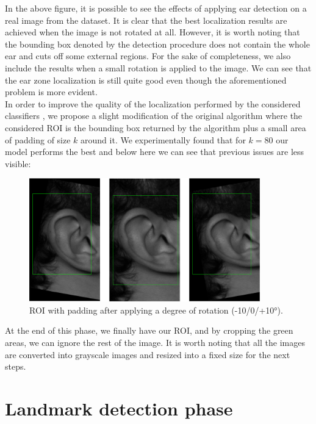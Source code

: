 \documentclass{article}
\begin{document}
In the above figure, it is possible to see the effects of applying ear detection on a real image from the
dataset. It is clear that the best localization results are achieved when the image is not rotated at all.
However, it is worth noting that the bounding box denoted by the detection procedure does not contain the
whole ear and cuts off some external regions.  For the sake of completeness, we also include the results when
a small rotation is applied to the image. We can see that the ear zone localization is still quite good even
though the aforementioned problem is more evident.\\

In order to improve the quality of the localization performed by the considered classifiers \cite{Castrillon11-caepia},
we propose a slight modification of the original algorithm
where the considered ROI is the bounding box returned by the algorithm plus a small area of padding of size
$k$ around it. We experimentally found that for $k=80$ our model performs the best and below here we can
see that previous issues are less visible:

\begin{figure}[h]
    \begin{center}
        \includegraphics[width=10cm,keepaspectratio]{images/padding_detection.png}
        \caption{ROI with padding after applying a degree of rotation (-10/0/+10°).}
    \end{center}
\end{figure}

At the end of this phase, we finally have our ROI, and by cropping the green areas,
we can ignore the rest of the image. It is worth noting that all the images are converted into
grayscale images and resized into a fixed size for the next steps.

\section{Landmark detection phase}
\end{document}
